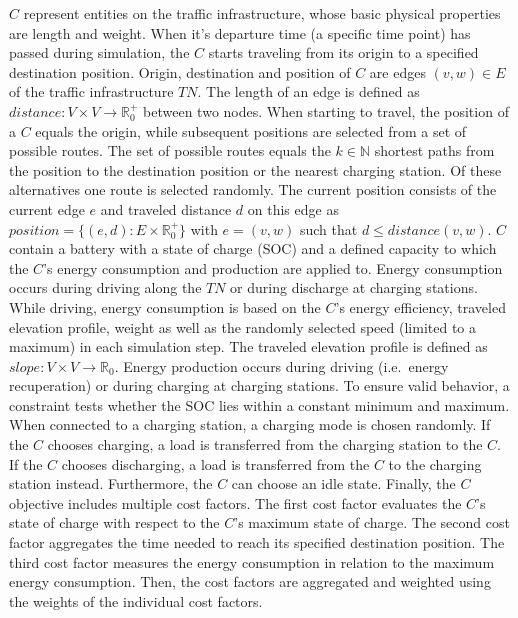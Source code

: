 $C$ represent entities on the traffic infrastructure, whose basic physical properties are length and weight.
When it's departure time (a specific time point) has passed during simulation, the $C$ starts traveling from its origin to a specified destination position. Origin, destination and position of $C$ are edges $(v,w) \in E$ of the traffic infrastructure $TN$. The length of an edge is defined as $\mathit{distance}: V \times V \to\mathbb{R}_0^+$ between two nodes.
When starting to travel, the position of a $C$ equals the origin, while subsequent positions are selected from a set of possible routes. The set of possible routes equals the $k \in \mathbb{N}$ shortest paths from the position to the destination position or the nearest charging station. Of these alternatives one route is selected randomly. The current position consists of the current edge $e$ and traveled distance $d$ on this edge as
$\mathit{position} = \{(e,d): E \times \mathbb{R}_0^+ \}$ 
with $e = (v,w)$ such that $d \leq distance(v,w)$.
$C$ contain a battery with a state of charge (SOC) and a defined capacity to which the $C$'s energy consumption and production are applied to.
Energy consumption occurs during driving along the $TN$ or during discharge at charging stations. While driving, energy consumption is based on the $C$'s energy efficiency, traveled elevation profile, weight as well as the randomly selected speed (limited to a maximum) in each simulation step. The traveled elevation profile is defined as
$\mathit{slope} : V \times V \to \mathbb{R}_0$. 
Energy production occurs during driving (i.e.\ energy recuperation) or during charging at charging stations. To ensure valid behavior, a constraint tests whether the SOC lies within a constant minimum and maximum. When connected to a charging station, a charging mode is chosen randomly. If the $C$ chooses charging, a load is transferred from the charging station to the $C$. If the $C$ chooses discharging, a load is transferred from the $C$ to the charging station instead. Furthermore, the $C$ can choose an idle state.
Finally, the $C$ objective includes multiple cost factors.
The first cost factor evaluates the $C$'s state of charge with respect to the $C$'s maximum state of charge. The second cost factor aggregates the time needed to reach its specified destination position. The third cost factor measures the energy consumption in relation to the maximum energy consumption. Then, the cost factors are aggregated and weighted using the weights of the individual cost factors.

